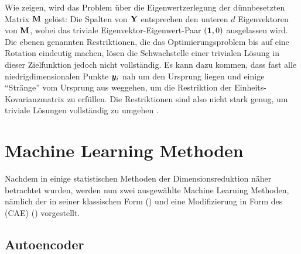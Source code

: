 Wie \textcite[3 -- 4]{Ghojogh.2020} zeigen, wird das Problem über die Eigenwertzerlegung der
dünnbesetzten Matrix $\mathbf{M}$ gelöst: Die Spalten von $\mathbf{Y}$ entsprechen den unteren $d$
Eigenvektoren von $\mathbf{M}$, wobei das triviale Eigenvektor-Eigenwert-Paar $(\bm{1}, 0)$ ausgelassen
wird. Die ebenen genannten Restriktionen, die das Optimierungsproblem bis auf eine Rotation
eindeutig machen, lösen die Schwachstelle einer trivialen Lösung in dieser Zielfunktion jedoch
nicht vollständig. Es kann dazu kommen, dass fast alle niedrigdimensionalen Punkte $\bm{y}_i$ nah
um den Ursprung liegen und einige \enquote{Stränge} vom Ursprung aus weggehen, um die Restriktion
der Einheits-Kovarianzmatrix zu erfüllen. Die Restriktionen sind also nicht stark genug, um
triviale Lösungen vollständig zu umgehen \parencite[vgl.][23]{vanderMaaten.2009}.

\section{Machine Learning Methoden}
\label{ch:MethodenDerDimRed:modern}
Nachdem in  einige statistischen Methoden der
Dimensionsreduktion näher betrachtet wurden, werden nun zwei ausgewählte Machine Learning Methoden,
nämlich der  in seiner klassischen Form
() und eine Modifizierung in Form des  (CAE) () vorgestellt.

\subsection{Autoencoder}
\label{ch:MethodenDerDimRed:ML:AE}

